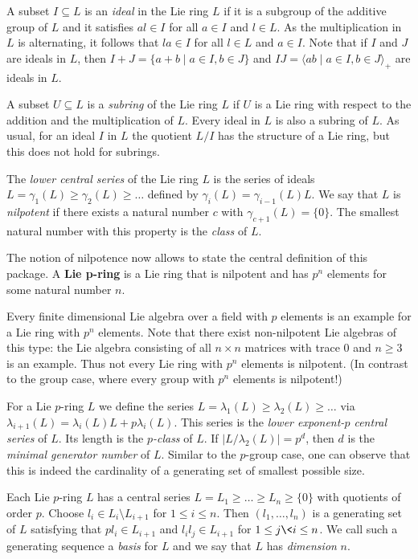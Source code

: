 A subset $I \subseteq L$ is an {\it ideal} in the Lie ring $L$ if it
is a subgroup of the additive group of $L$ and it satisfies $a l \in 
I$ for all $a \in I$ and $l \in L$. As the multiplication in $L$ is
alternating, it follows that $l a \in I$ for all $l \in L$ and $a \in 
I$. Note that if $I$ and $J$ are ideals in $L$, then $I + J = \{
a + b \mid a \in I, b \in J\}$ and $I J = \langle a b \mid 
a \in I, b \in J \rangle_+$ are ideals in $L$.
\medskip

A subset $U \subseteq L$ is a {\it subring} of the Lie ring $L$ if $U$
is a Lie ring with respect to the addition and the multiplication of $L$.
Every ideal in $L$ is also a subring of $L$. As usual, for an ideal $I$ in
$L$ the quotient $L/I$ has the structure of a Lie ring, but this does not
hold for subrings.
\medskip

The {\it lower central series} of the Lie ring $L$ is the series of ideals 
$L = \gamma_1(L) \geq \gamma_2(L) \geq \ldots$ defined by $\gamma_i(L)
= \gamma_{i-1}(L) L$. We say that $L$ is {\it nilpotent} if there exists a 
natural number $c$ with $\gamma_{c+1}(L) = \{0\}$. The smallest natural number 
with this property is the {\it class} of $L$.
\medskip

The notion of nilpotence now allows to state the central definition of 
this package. A {\bf Lie p-ring} is a Lie ring that is nilpotent and has 
$p^n$ elements for some natural number $n$. 
\medskip

Every finite dimensional Lie algebra over a field with $p$ elements 
is an example for a Lie ring with $p^n$ elements. Note that there exist
non-nilpotent Lie algebras of this type: the Lie algebra consisting of 
all $n \times n$ matrices with trace $0$ and $n \geq 3$ is an example. 
Thus not every Lie ring with $p^n$ elements is nilpotent. (In contrast
to the group case, where every group with $p^n$ elements is nilpotent!)
\medskip

For a Lie $p$-ring $L$ we define the series $L = \lambda_1(L) \geq 
\lambda_2(L) \geq \ldots$ 
via $\lambda_{i+1}(L) = \lambda_i(L) L + p \lambda_i(L)$. This 
series is the {\it lower exponent-$p$ central series} of $L$. Its length 
is the {\it $p$-class} of $L$. If $|L/\lambda_2(L)| = p^d$, then $d$ is 
the {\it minimal generator number} of $L$. Similar to the $p$-group case, 
one can observe that this is indeed the cardinality of a generating set 
of smallest possible size.
\medskip

Each Lie $p$-ring $L$ has a central series $L = L_1 \geq \ldots \geq L_n 
\geq \{0\}$ with quotients of order $p$. Choose $l_i \in L_i \setminus 
L_{i+1}$ for $1 \leq i \leq n$. Then $(l_1, \ldots, l_n)$ is a generating 
set of $L$ satisfying that $p l_i \in L_{i+1}$ and $l_i l_j 
\in L_{i+1}$ for $1 \leq j \< i \leq n$. We call such a generating sequence 
a {\it basis} for $L$ and we say that $L$ has {\it dimension} $n$.


